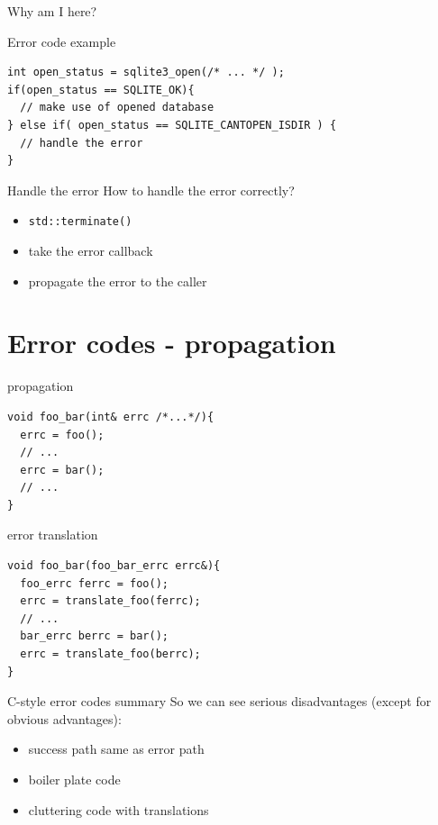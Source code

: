 \documentclass[10pt]{beamer}
\begin{document}
\begin{frame}{Why am I here?}
\begin{frame}[fragile]{Error code example}
	\pause
	
	\hrulefill
	
	\begin{verbatim}
int open_status = sqlite3_open(/* ... */ );
if(open_status == SQLITE_OK){
  // make use of opened database
} else if( open_status == SQLITE_CANTOPEN_ISDIR ) {
  // handle the error
}
	\end{verbatim}
	
\end{frame}

\begin{frame}{Handle the error}
	How to handle the error correctly?
	
	\pause
	
	\begin{itemize}[<+- | alert@+>]
		\item \texttt{std::terminate()}
		\item take the error callback
		\item propagate the error to the caller
	\end{itemize}
	
\end{frame}

\section{Error codes - propagation}

\begin{frame}[fragile]{propagation}
	\begin{verbatim}
void foo_bar(int& errc /*...*/){
  errc = foo();
  // ...
  errc = bar();		
  // ...
}
	\end{verbatim}
	
\end{frame}

\begin{frame}[fragile]{error translation}
	\begin{verbatim}
void foo_bar(foo_bar_errc errc&){
  foo_errc ferrc = foo();
  errc = translate_foo(ferrc);
  // ...
  bar_errc berrc = bar();
  errc = translate_foo(berrc);
}
	\end{verbatim}
\end{frame}

\begin{frame}{C-style error codes summary}
	So we can see {\color{red}serious disadvantages} (except for {\color{blue}obvious advantages}):
	
	\begin{itemize}[<+- | alert@+>]
		\item success path same as error path
		\item boiler plate code
		\item cluttering code with translations
	\end{itemize}
\end{frame}
	

\end{frame}
\end{document}
